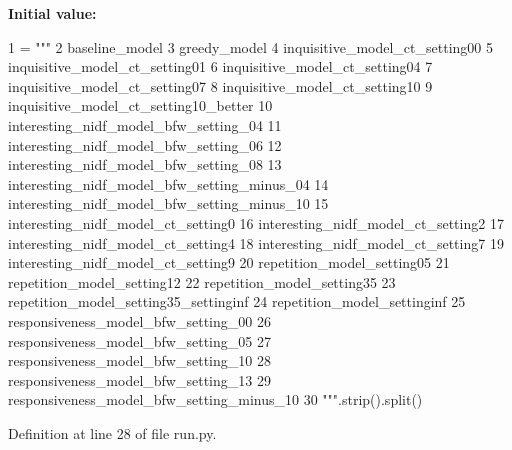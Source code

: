 {\bfseries Initial value\+:}
\begin{DoxyCode}
1 =  \textcolor{stringliteral}{"""}
2 \textcolor{stringliteral}{baseline\_model}
3 \textcolor{stringliteral}{greedy\_model}
4 \textcolor{stringliteral}{inquisitive\_model\_ct\_setting00}
5 \textcolor{stringliteral}{inquisitive\_model\_ct\_setting01}
6 \textcolor{stringliteral}{inquisitive\_model\_ct\_setting04}
7 \textcolor{stringliteral}{inquisitive\_model\_ct\_setting07}
8 \textcolor{stringliteral}{inquisitive\_model\_ct\_setting10}
9 \textcolor{stringliteral}{inquisitive\_model\_ct\_setting10\_better}
10 \textcolor{stringliteral}{interesting\_nidf\_model\_bfw\_setting\_04}
11 \textcolor{stringliteral}{interesting\_nidf\_model\_bfw\_setting\_06}
12 \textcolor{stringliteral}{interesting\_nidf\_model\_bfw\_setting\_08}
13 \textcolor{stringliteral}{interesting\_nidf\_model\_bfw\_setting\_minus\_04}
14 \textcolor{stringliteral}{interesting\_nidf\_model\_bfw\_setting\_minus\_10}
15 \textcolor{stringliteral}{interesting\_nidf\_model\_ct\_setting0}
16 \textcolor{stringliteral}{interesting\_nidf\_model\_ct\_setting2}
17 \textcolor{stringliteral}{interesting\_nidf\_model\_ct\_setting4}
18 \textcolor{stringliteral}{interesting\_nidf\_model\_ct\_setting7}
19 \textcolor{stringliteral}{interesting\_nidf\_model\_ct\_setting9}
20 \textcolor{stringliteral}{repetition\_model\_setting05}
21 \textcolor{stringliteral}{repetition\_model\_setting12}
22 \textcolor{stringliteral}{repetition\_model\_setting35}
23 \textcolor{stringliteral}{repetition\_model\_setting35\_settinginf}
24 \textcolor{stringliteral}{repetition\_model\_settinginf}
25 \textcolor{stringliteral}{responsiveness\_model\_bfw\_setting\_00}
26 \textcolor{stringliteral}{responsiveness\_model\_bfw\_setting\_05}
27 \textcolor{stringliteral}{responsiveness\_model\_bfw\_setting\_10}
28 \textcolor{stringliteral}{responsiveness\_model\_bfw\_setting\_13}
29 \textcolor{stringliteral}{responsiveness\_model\_bfw\_setting\_minus\_10}
30 \textcolor{stringliteral}{"""}.strip().split()
\end{DoxyCode}


Definition at line 28 of file run.\+py.

